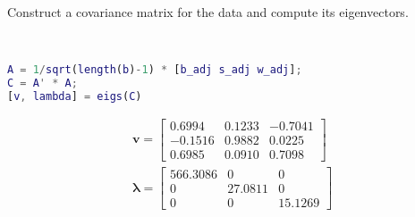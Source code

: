 Construct a covariance matrix for the data and compute its eigenvectors.

\begin{solution} \
    \begin{lstlisting}[language=Matlab]
A = 1/sqrt(length(b)-1) * [b_adj s_adj w_adj];
C = A' * A;
[v, lambda] = eigs(C)
    \end{lstlisting}
    
    \begin{align*}
        \boldsymbol{v} = \begin{bmatrix}
            0.6994 & 0.1233 & -0.7041 \\
           -0.1516 & 0.9882 &  0.0225 \\
            0.6985 & 0.0910 &  0.7098
        \end{bmatrix} \\
        \boldsymbol{\lambda} = \begin{bmatrix}
            566.3086 & 0 & 0 \\
            0 & 27.0811 & 0 \\
            0 & 0 & 15.1269
        \end{bmatrix}
    \end{align*}
\end{solution}